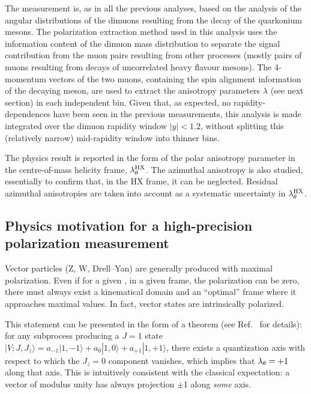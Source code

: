 The measurement is, as in all the previous analyses, based on the 
analysis of the angular distributions of the dimuons
resulting from the decay of the quarkonium mesons.
The polarization extraction method used in this analysis uses the information
content of the dimuon mass distribution to separate the \jpsi signal contribution 
from the muon pairs resulting from other processes 
(mostly pairs of muons resulting from decays of uncorrelated heavy flavour mesons).
The 4-momentum vectors of the two muons, 
containing the spin alignment information of the decaying meson, 
are used to extract the anisotropy parameters $\lambda$ (see next section)
in each independent \pt bin.
Given that, as expected,
no rapidity-dependences have been seen in the previous measurements,
this analysis is made integrated over the dimuon rapidity window $|y| < 1.2$,
without splitting this (relatively narrow) mid-rapidity window into thinner bins.

The physics result is reported in the form of the polar anisotropy parameter 
in the centre-of-mass helicity frame, $\lambda_\theta^{\rm HX}$.
The azimuthal anisotropy is also studied, essentially to confirm that, 
in the HX frame, it can be neglected.
Residual azimuthal anisotropies are taken into account 
as a systematic uncertainty in $\lambda_\theta^{\rm HX}$.

\subsection{Physics motivation for a high-precision polarization measurement}

Vector particles (Z, W, Drell--Yan) are generally produced with maximal polarization. 
Even if for a given \pt, in a given frame, the polarization can be zero, 
there must always exist a kinematical domain and an ``optimal'' frame 
where it approaches maximal values. In fact, vector states are intrinsically polarized.

This statement can be presented in the form of a theorem 
(see Ref.~\cite{bib:Faccioli-PRL-FrameInv} for details):
for any subprocess producing a $J=1$ state 
$|V;J, J_z \rangle = a_{-1} |1, -1\rangle + a_{0} |1, 0\rangle + a_{+1} |1, +1\rangle$, 
there exists a quantization axis with respect to which the $J_z = 0$ component vanishes, 
which implies that $\lambda_\theta = +1$ along that axis.
This is intuitively consistent with the classical expectation: 
a vector of modulus unity has always projection $\pm$1 along \emph{some} axis.

